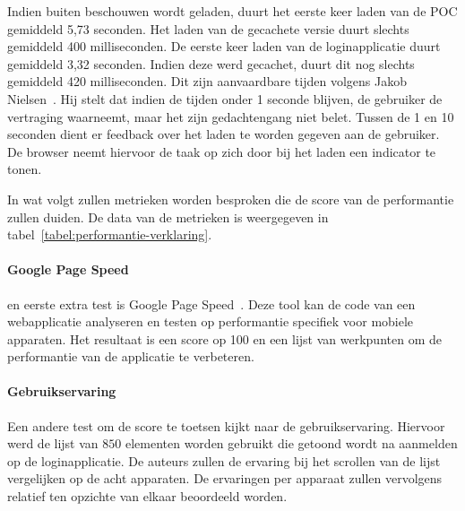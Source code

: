 
Indien \st{} buiten beschouwen wordt geladen, duurt het eerste keer laden van de POC gemiddeld 5,73 seconden. Het laden van de gecachete versie duurt slechts gemiddeld 400 milliseconden.
De eerste keer laden van de loginapplicatie duurt gemiddeld 3,32 seconden.
Indien deze werd gecachet, duurt dit nog slechts gemiddeld 420 milliseconden.
Dit zijn aanvaardbare tijden volgens Jakob Nielsen~\cite{Nielsen1993}.
Hij stelt dat indien de tijden onder 1 seconde blijven, de gebruiker de vertraging waarneemt, maar het zijn gedachtengang niet belet.
Tussen de 1 en 10 seconden dient er feedback over het laden te worden gegeven aan de gebruiker.
De browser neemt hiervoor de taak op zich door bij het laden een indicator te tonen.


In wat volgt zullen metrieken worden besproken die de score van de performantie zullen duiden.
De data van de metrieken is weergegeven in tabel~\ref{tabel:performantie-verklaring}.

\paragraph{Google Page Speed}
en eerste extra test is Google Page Speed~\cite{Morgan2011}. 
Deze tool kan de code van een webapplicatie analyseren en testen op performantie specifiek voor mobiele apparaten.
Het resultaat is een score op 100 en een lijst van werkpunten om de performantie van de applicatie te verbeteren.

\paragraph{Gebruikservaring}
Een andere test om de score te toetsen kijkt naar de gebruikservaring.
Hiervoor werd de lijst van $850$ elementen worden gebruikt die getoond wordt na aanmelden op de loginapplicatie.
De auteurs zullen de ervaring bij het scrollen van de lijst vergelijken op de acht apparaten.
De ervaringen per apparaat zullen vervolgens relatief ten opzichte van elkaar beoordeeld worden.


